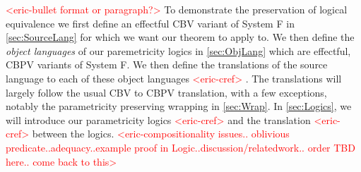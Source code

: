 \documentclass[acmsmall]{acmart}
\newcommand{\eric}[1]{\textcolor{red}{ <eric-#1> }}
\begin{document}
\eric{bullet format or paragraph?}
 To demonstrate the preservation of logical equivalence we first define an effectful CBV variant of System F in \cref{sec:SourceLang} for which we want our theorem to apply to. We then define the \textit{object languages} of our paremetricity logics in \cref{sec:ObjLang} which are effectful, CBPV \cite{CBPV} variants of System F. We then define the translations of the source language to each of these object languages \eric{cref}. The translations will largely follow the usual\cite{CBPV} CBV to CBPV translation, with a few exceptions, notably the parametricity preserving wrapping in \cref{sec:Wrap}. In \cref{sec:Logics}, we will introduce our parametricity logics\eric{cref} and the translation \eric{cref} between the logics.
 \eric{compositionality issues.. oblivious predicate..adequacy..example proof in Logic..discussion/relatedwork.. order TBD here.. come back to this}







\begin{comment}
\subsubsection{Gradual Typing with Fresh Quantification}

To illustrate this, we will consider a polymorphic Call-by-push-value \eric{cite} calculus with an extensible sum type denoted $OSum$ which we use to represent the dynamic type Dyn. In order to inject a value, $V:A$, into $OSum$, we need a $Case$ symbol associated with the type $A$. Case symbols are representative of the runtime type tags of the dynamic type and can be dynamically allocated by the expression $new_A : F(Case\;A)$. The introduction from of the extensible sum type, $inj_\sigma\;V : OSum$ uses a case symbol $\sigma : Case\;A$ to store a value $V:A$. The elimination form, $rec_{OSum}\;(inj_\sigma\;V),\sigma'\;\{x.\;M\;|\;N\}$, compares the case symbol $\sigma$ used to inject the value into $OSum$ to a given case symbol $\sigma'$. When the case symbols match, the value stored in $OSum$ is bound to $x$ in the continuation $M$. Otherwise, we proceed with the default case $N$. Assuming a preallocated set of case symbols $\sigma_\mathbb{B} : Case\;\mathbb{B},\sigma_\times : Case\;(OSum \times OSum),\sigma_\to : Case\;(OSum \to OSum),...$, we can encode the example above as:
$$t : \forall X.Case\;X \to X \to F\mathbb{B} := \Lambda X. \lambda \sigma_X.\lambda x.rec_{OSum}\;(inj_{\sigma_X}x),\sigma_\mathbb{B}\;\{x.\;ret\;x\;|\;\Omega\}$$
\\
\\
\end{comment}
\end{document}
